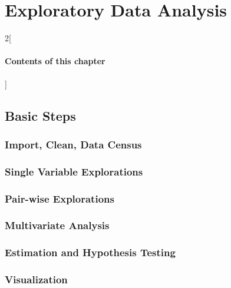 \chapter{Exploratory Data Analysis}

\begin{multicols}{2}[\subsubsection*{Contents of this chapter}]
\end{multicols}

\section{Basic Steps}

\subsection{Import, Clean, Data Census}

\subsection{Single Variable Explorations}

\subsection{Pair-wise Explorations}

\subsection{Multivariate Analysis}

\subsection{Estimation and Hypothesis Testing}

\subsection{Visualization}
